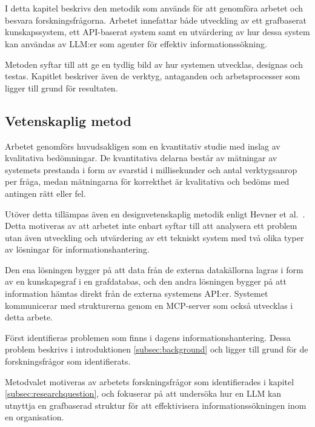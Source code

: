 \section{}\label{sec:method}
I detta kapitel beskrivs den metodik som används för att genomföra arbetet och besvara forskningsfrågorna.
Arbetet innefattar både utveckling av ett grafbaserat kunskapssystem, ett API-baserat system samt en utvärdering
 av hur dessa system kan användas av LLM:er som agenter för effektiv informationssökning.

Metoden syftar till att ge en tydlig bild av hur systemen utvecklas, designas och testas.
 Kapitlet beskriver även de verktyg, antaganden och arbetsprocesser som ligger till grund för resultaten.

\subsection{Vetenskaplig metod}\label{subsec:scientificmethod}
Arbetet genomförs huvudsakligen som en kvantitativ studie med inslag av kvalitativa bedömningar.
 De kvantitativa delarna består av mätningar av systemets prestanda i form av svarstid i millisekunder och antal verktygsanrop per fråga, medan mätningarna för korrekthet är kvalitativa och bedöms med antingen rätt eller fel.

Utöver detta tillämpas även en designvetenskaplig metodik enligt Hevner et al.~\cite{hevner2004design}.
 Detta motiveras av att arbetet inte enbart syftar till att analysera ett problem utan även utveckling och
  utvärdering av ett tekniskt system med två olika typer av lösningar för informationshantering.

Den ena lösningen bygger på att data från de externa datakällorna lagras i form av en kunskapsgraf i en grafdatabas, och den andra lösningen bygger på att information hämtas direkt från de externa systemens API:er.
Systemet kommunicerar med strukturerna genom en MCP-server som också utvecklas i detta arbete.

Först identifieras problemen som finns i dagens informationshantering.
 Dessa problem beskrivs i introduktionen \ref{subsec:background} och ligger till grund för de forskningsfrågor som identifierats.

Metodvalet motiveras av arbetets forskningsfrågor som identifierades i kapitel \ref{subsec:researchquestion}, och fokuserar på att undersöka hur en LLM kan utnyttja en grafbaserad struktur 
för att effektivisera informationssökningen inom en organisation.

